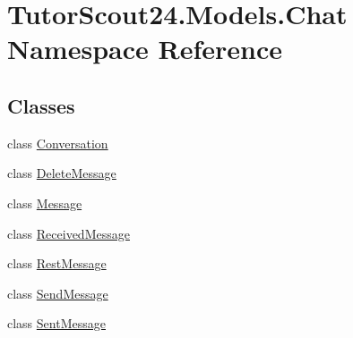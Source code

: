 \hypertarget{namespace_tutor_scout24_1_1_models_1_1_chat}{}\section{Tutor\+Scout24.\+Models.\+Chat Namespace Reference}
\label{namespace_tutor_scout24_1_1_models_1_1_chat}
\subsection*{Classes}
\begin{DoxyCompactItemize}
\item 
class \mbox{\hyperlink{class_tutor_scout24_1_1_models_1_1_chat_1_1_conversation}{Conversation}}
\item 
class \mbox{\hyperlink{class_tutor_scout24_1_1_models_1_1_chat_1_1_delete_message}{Delete\+Message}}
\item 
class \mbox{\hyperlink{class_tutor_scout24_1_1_models_1_1_chat_1_1_message}{Message}}
\item 
class \mbox{\hyperlink{class_tutor_scout24_1_1_models_1_1_chat_1_1_received_message}{Received\+Message}}
\item 
class \mbox{\hyperlink{class_tutor_scout24_1_1_models_1_1_chat_1_1_rest_message}{Rest\+Message}}
\item 
class \mbox{\hyperlink{class_tutor_scout24_1_1_models_1_1_chat_1_1_send_message}{Send\+Message}}
\item 
class \mbox{\hyperlink{class_tutor_scout24_1_1_models_1_1_chat_1_1_sent_message}{Sent\+Message}}
\end{DoxyCompactItemize}

